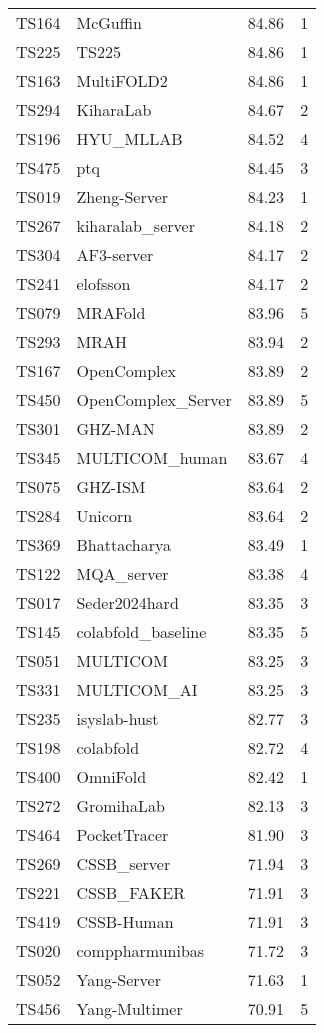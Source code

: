 \begin{table}[ht]
{\begin{tabular}{llrr}
TS164 & McGuffin & 84.86 & 1 \\ 
TS225 & TS225 & 84.86 & 1 \\ 
TS163 & MultiFOLD2 & 84.86 & 1 \\ 
TS294 & KiharaLab & 84.67 & 2 \\ 
TS196 & HYU\_MLLAB & 84.52 & 4 \\ 
TS475 & ptq & 84.45 & 3 \\ 
TS019 & Zheng-Server & 84.23 & 1 \\ 
TS267 & kiharalab\_server & 84.18 & 2 \\ 
TS304 & AF3-server & 84.17 & 2 \\ 
TS241 & elofsson & 84.17 & 2 \\ 
TS079 & MRAFold & 83.96 & 5 \\ 
TS293 & MRAH & 83.94 & 2 \\ 
TS167 & OpenComplex & 83.89 & 2 \\ 
TS450 & OpenComplex\_Server & 83.89 & 5 \\ 
TS301 & GHZ-MAN & 83.89 & 2 \\ 
TS345 & MULTICOM\_human & 83.67 & 4 \\ 
TS075 & GHZ-ISM & 83.64 & 2 \\ 
TS284 & Unicorn & 83.64 & 2 \\ 
TS369 & Bhattacharya & 83.49 & 1 \\ 
TS122 & MQA\_server & 83.38 & 4 \\ 
TS017 & Seder2024hard & 83.35 & 3 \\ 
TS145 & colabfold\_baseline & 83.35 & 5 \\ 
TS051 & MULTICOM & 83.25 & 3 \\ 
TS331 & MULTICOM\_AI & 83.25 & 3 \\ 
TS235 & isyslab-hust & 82.77 & 3 \\ 
TS198 & colabfold & 82.72 & 4 \\ 
TS400 & OmniFold & 82.42 & 1 \\ 
TS272 & GromihaLab & 82.13 & 3 \\ 
TS464 & PocketTracer & 81.90 & 3 \\ 
TS269 & CSSB\_server & 71.94 & 3 \\ 
TS221 & CSSB\_FAKER & 71.91 & 3 \\ 
TS419 & CSSB-Human & 71.91 & 3 \\ 
TS020 & comppharmunibas & 71.72 & 3 \\ 
TS052 & Yang-Server & 71.63 & 1 \\ 
TS456 & Yang-Multimer & 70.91 & 5 \\ 

\end{tabular}}
\end{table}
